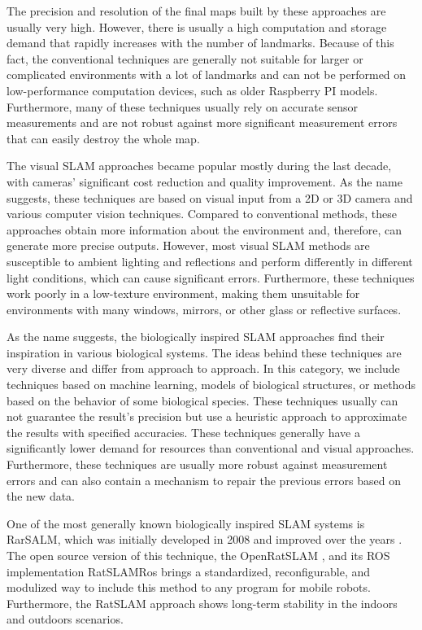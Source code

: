 The precision and resolution of the final maps built by these approaches are usually very high. However, there is usually a high computation and storage demand that rapidly increases with the number of landmarks. Because of this fact, the conventional techniques are generally not suitable for larger or complicated environments with a lot of landmarks and can not be performed on low-performance computation devices, such as older Raspberry PI models. Furthermore, many of these techniques usually rely on accurate sensor measurements and are not robust against more significant measurement errors that can easily destroy the whole map.\par
The visual SLAM approaches became popular mostly during the last decade, with cameras' significant cost reduction and quality improvement. As the name suggests, these techniques are based on visual input from a 2D or 3D camera and various computer vision techniques. Compared to conventional methods, these approaches obtain more information about the environment and, therefore, can generate more precise outputs. However, most visual SLAM methods are susceptible to ambient lighting and reflections and perform differently in different light conditions, which can cause significant errors. Furthermore, these techniques work poorly in a low-texture environment, making them unsuitable for environments with many windows, mirrors, or other glass or reflective surfaces.\cite{visualSLAM}\par
As the name suggests, the biologically inspired SLAM approaches find their inspiration in various biological systems. The ideas behind these techniques are very diverse and differ from approach to approach. In this category, we include techniques based on machine learning, models of biological structures, or methods based on the behavior of some biological species. These techniques usually can not guarantee the result's precision but use a heuristic approach to approximate the results with specified accuracies. These techniques generally have a significantly lower demand for resources than conventional and visual approaches. Furthermore, these techniques are usually more robust against measurement errors and can also contain a mechanism to repair the previous errors based on the new data.\par
One of the most generally known biologically inspired SLAM systems is RarSALM, which was initially developed in 2008 and improved over the years \cite{RatSLAM}. The open source version of this technique, the OpenRatSLAM \cite{OpenRatSLAM}, and its ROS implementation RatSLAMRos \cite{RatSLAMROS} brings a standardized, reconfigurable, and modulized way to include this method to any program for mobile robots. Furthermore, the RatSLAM approach shows long-term stability in the indoors and outdoors scenarios.\cite{RatSLAMExp1}\cite{RatSLAMExp2}\cite{RatSLAMExp3}\cite{RatSLAMExp4}\par
